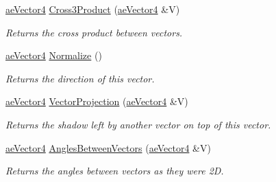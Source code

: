 \begin{DoxyCompactItemize}
\hyperlink{structae_core_1_1ae_vector4}{ae\+Vector4} \hyperlink{structae_core_1_1ae_vector4_a4e9a8226e340c2d32e59ec372295e775}{Cross3\+Product} (\hyperlink{structae_core_1_1ae_vector4}{ae\+Vector4} \&V)
\begin{DoxyCompactList}\small\item\em Returns the cross product between vectors. \end{DoxyCompactList}\item 
\hyperlink{structae_core_1_1ae_vector4}{ae\+Vector4} \hyperlink{structae_core_1_1ae_vector4_a701f367710e93033b18023b4d6d3cd8b}{Normalize} ()
\begin{DoxyCompactList}\small\item\em Returns the direction of this vector. \end{DoxyCompactList}\item 
\hyperlink{structae_core_1_1ae_vector4}{ae\+Vector4} \hyperlink{structae_core_1_1ae_vector4_aa102059eaffc8b4f9f15dd66e4a16ba8}{Vector\+Projection} (\hyperlink{structae_core_1_1ae_vector4}{ae\+Vector4} \&V)
\begin{DoxyCompactList}\small\item\em Returns the shadow left by another vector on top of this vector. \end{DoxyCompactList}\item 
\hyperlink{structae_core_1_1ae_vector4}{ae\+Vector4} \hyperlink{structae_core_1_1ae_vector4_a8463b1b2363eb7fe65ad54932c3185d0}{Angles\+Between\+Vectors} (\hyperlink{structae_core_1_1ae_vector4}{ae\+Vector4} \&V)
\begin{DoxyCompactList}\small\item\em Returns the angles between vectors as they were 2D. \end{DoxyCompactList}\end{DoxyCompactItemize}

